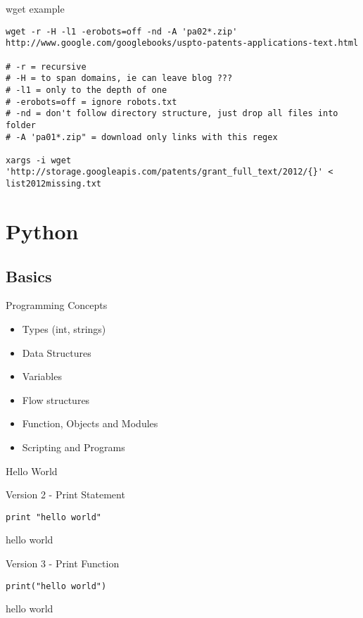 \documentclass[presentation]{beamer}
\begin{document}
\begin{frame}[fragile,label=sec-3-0-9]{wget example}
 \lstset{numbers=left,language=sh,label= ,caption= }
\begin{lstlisting}
wget -r -H -l1 -erobots=off -nd -A 'pa02*.zip' http://www.google.com/googlebooks/uspto-patents-applications-text.html

# -r = recursive
# -H = to span domains, ie can leave blog ??? 
# -l1 = only to the depth of one 
# -erobots=off = ignore robots.txt
# -nd = don't follow directory structure, just drop all files into folder
# -A 'pa01*.zip" = download only links with this regex

xargs -i wget 'http://storage.googleapis.com/patents/grant_full_text/2012/{}' < list2012missing.txt
\end{lstlisting}
\end{frame}
\section{Python}
\label{sec-4}

\subsection{Basics}
\label{sec-4-1}

\begin{frame}[label=sec-4-1-1]{Programming Concepts}
\begin{itemize}
\item Types (int, strings)
\item Data Structures
\item Variables
\item Flow structures
\item Function, Objects and Modules
\item Scripting and Programs
\end{itemize}
\end{frame}


\begin{frame}[fragile,label=sec-4-1-2]{Hello World}
 \begin{block}{Version 2 - Print Statement}
\lstset{numbers=left,language=Python,label= ,caption= }
\begin{lstlisting}
print "hello world"
\end{lstlisting}

hello world
\end{block}

\begin{block}{Version 3 - Print Function}
\lstset{numbers=left,language=Python,label= ,caption= }
\begin{lstlisting}
print("hello world")
\end{lstlisting}

hello world
\end{block}

\end{frame}
\end{document}
